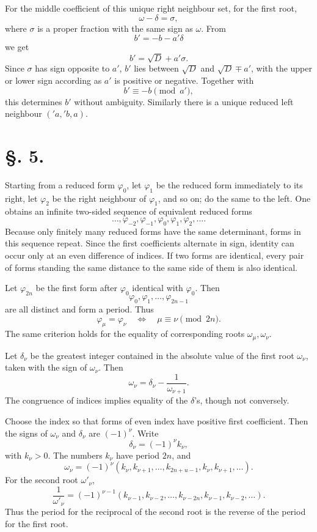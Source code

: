 \documentclass[11pt]{article}
\begin{document}
For the middle coefficient of this unique right neighbour set, for the first root,
\[
 \omega-
\delta=\sigma,
\]
where $\sigma$ is a proper fraction with the same sign as $\omega$. From
\[
 b'=-b-a'\delta
\]
we get
\[
 b'=\sqrt D+a'\sigma.
\]
Since $\sigma$ has sign opposite to $a'$, $b'$ lies between $\sqrt D$ and $\sqrt D\mp a'$, with the upper or lower sign according as $a'$ is positive or negative. Together with
\[
 b'\equiv -b\pmod {a'},
\]
this determines $b'$ without ambiguity. Similarly there is a unique reduced left neighbour $({}'a,{}'b,a)$.

\section*{\S. 5.}

Starting from a reduced form $\varphi_0$, let $\varphi_1$ be the reduced form immediately to its right, let $\varphi_2$ be the right neighbour of $\varphi_1$, and so on; do the same to the left. One obtains an infinite two-sided sequence of equivalent reduced forms
\[
 \ldots,\varphi_{-2},\varphi_{-1},\varphi_0,
 \varphi_1,\varphi_2,\ldots.
\]
Because only finitely many reduced forms have the same determinant, forms in this sequence repeat. Since the first coefficients alternate in sign, identity can occur only at an even difference of indices. If two forms are identical, every pair of forms standing the same distance to the same side of them is also identical.

Let $\varphi_{2n}$ be the first form after $\varphi_0$ identical with $\varphi_0$. Then
\[
 \varphi_0,\varphi_1,\ldots,
\varphi_{2n-1}
\]
are all distinct and form a period. Thus
\[
 \varphi_\mu=\varphi_\nu
 \quad\Longleftrightarrow\quad
 \mu\equiv\nu\pmod {2n}.
\]
The same criterion holds for the equality of corresponding roots $\omega_\mu,\omega_\nu$.

Let $\delta_\nu$ be the greatest integer contained in the absolute value of the first root $\omega_\nu$, taken with the sign of $\omega_\nu$. Then
\[
 \omega_\nu=\delta_\nu-
\frac1{\omega_{\nu+1}}.
\]
The congruence of indices implies equality of the $\delta$'s, though not conversely.

Choose the index so that forms of even index have positive first coefficient. Then the signs of $\omega_\nu$ and $\delta_\nu$ are $(-1)^\nu$. Write
\[
 \delta_\nu=(-1)^\nu k_\nu,
\]
with $k_\nu>0$. The numbers $k_\nu$ have period $2n$, and
\[
 \omega_\nu=(-1)^\nu(k_\nu,k_{\nu+1},\ldots,k_{2n+
u-1},k_\nu,k_{\nu+1},\ldots).
\]
For the second root $\omega'_\nu$,
\[
 \frac1{\omega'_\nu}=(-1)^{\nu-1}(k_{\nu-1},k_{\nu-2},\ldots,k_{\nu-2n},k_{\nu-1},k_{\nu-2},\ldots).
\]
Thus the period for the reciprocal of the second root is the reverse of the period for the first root.
\end{document}
